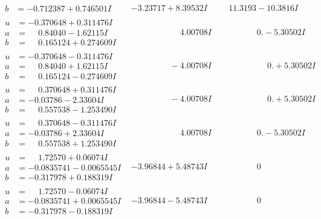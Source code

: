 \documentclass[1p]{elsarticle_modified}
\theoremstyle{definition}
\begin{document}
$$\begin{array}{c|c|c}
\begin{aligned}
b &= -0.712387 + 0.746501 I\end{aligned}
 & -3.23717 + 8.39532 I & \phantom{-}11.3193 - 10.3816 I \\ \hline\begin{aligned}
u &= -0.370648 + 0.311476 I \\
a &= \phantom{-}0.84040 - 1.62115 I \\
b &= \phantom{-}0.165124 + 0.274609 I\end{aligned}
 & \phantom{-0.000000 -}4.00708 I & \phantom{-0.000000 } 0. - 5.30502 I \\ \hline\begin{aligned}
u &= -0.370648 - 0.311476 I \\
a &= \phantom{-}0.84040 + 1.62115 I \\
b &= \phantom{-}0.165124 - 0.274609 I\end{aligned}
 & \phantom{-0.000000 } -4.00708 I & \phantom{-0.000000 -}0. + 5.30502 I \\ \hline\begin{aligned}
u &= \phantom{-}0.370648 + 0.311476 I \\
a &= -0.03786 - 2.33604 I \\
b &= \phantom{-}0.557538 - 1.253490 I\end{aligned}
 & \phantom{-0.000000 } -4.00708 I & \phantom{-0.000000 -}0. + 5.30502 I \\ \hline\begin{aligned}
u &= \phantom{-}0.370648 - 0.311476 I \\
a &= -0.03786 + 2.33604 I \\
b &= \phantom{-}0.557538 + 1.253490 I\end{aligned}
 & \phantom{-0.000000 -}4.00708 I & \phantom{-0.000000 } 0. - 5.30502 I \\ \hline\begin{aligned}
u &= \phantom{-}1.72570 + 0.06074 I \\
a &= -0.0835741 - 0.0065545 I \\
b &= -0.317978 + 0.188319 I\end{aligned}
 & -3.96844 + 5.48743 I & \phantom{-0.000000 } 0 \\ \hline\begin{aligned}
u &= \phantom{-}1.72570 - 0.06074 I \\
a &= -0.0835741 + 0.0065545 I \\
b &= -0.317978 - 0.188319 I\end{aligned}
 & -3.96844 - 5.48743 I & \phantom{-0.000000 } 0\\

\end{array}$$
\end{document}
